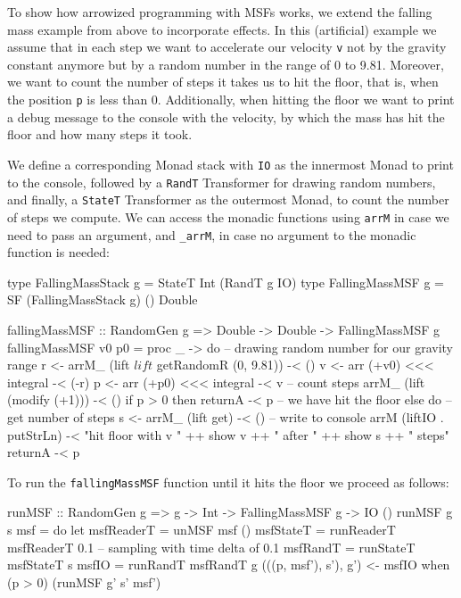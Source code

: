 To show how arrowized programming with MSFs works, we extend the falling mass example from above to incorporate effects. In this (artificial) example we assume that in each step we want to accelerate our velocity \texttt{v} not by the gravity constant anymore but by a random number in the range of 0 to 9.81. Moreover, we want to count the number of steps it takes us to hit the floor, that is, when the position \texttt{p} is less than 0. Additionally, when hitting the floor we want to print a debug message to the console with the velocity, by which the mass has hit the floor and how many steps it took.

We define a corresponding Monad stack with \texttt{IO} as the innermost Monad to print to the console, followed by a \texttt{RandT} Transformer for drawing random numbers, and finally, a \texttt{StateT} Transformer as the outermost Monad, to count the number of steps we compute. We can access the monadic functions using \texttt{arrM} in case we need to pass an argument, and \texttt{\_arrM}, in case no argument to the monadic function is needed:

\begin{HaskellCode}
type FallingMassStack g = StateT Int (RandT g IO)
type FallingMassMSF g   = SF (FallingMassStack g) () Double

fallingMassMSF :: RandomGen g => Double -> Double -> FallingMassMSF g
fallingMassMSF v0 p0 = proc _ -> do
  -- drawing random number for our gravity range
  r <- arrM_ (lift $ lift $ getRandomR (0, 9.81)) -< ()
  v <- arr (+v0) <<< integral -< (-r)
  p <- arr (+p0) <<< integral -< v
  -- count steps
  arrM_ (lift (modify (+1))) -< ()
  if p > 0
    then returnA -< p
    -- we have hit the floor
    else do
      -- get number of steps
      s <- arrM_ (lift get) -< ()
      -- write to console
      arrM (liftIO . putStrLn) -< "hit floor with v " ++ show v ++ 
                                  " after " ++ show s ++ " steps"
      returnA -< p
\end{HaskellCode}

To run the \texttt{fallingMassMSF} function until it hits the floor we proceed as follows:

\begin{HaskellCode}
runMSF :: RandomGen g => g -> Int -> FallingMassMSF g -> IO ()
runMSF g s msf = do
  let msfReaderT = unMSF msf ()
      msfStateT  = runReaderT msfReaderT 0.1 -- sampling with time delta of 0.1
      msfRandT   = runStateT msfStateT s
      msfIO      = runRandT msfRandT g
  (((p, msf'), s'), g') <- msfIO
  when (p > 0) (runMSF g' s' msf')
\end{HaskellCode}

